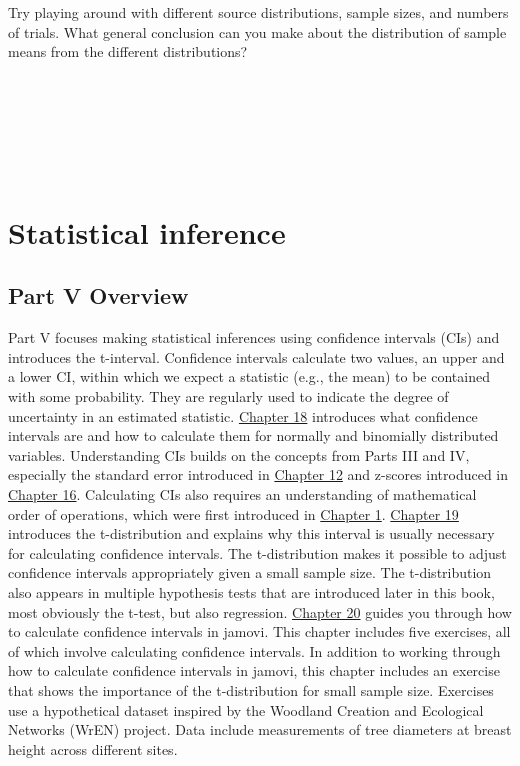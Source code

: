 \documentclass[
]{scrbook}
\begin{document}
\begin{verbatim}






\end{verbatim}

Try playing around with different source distributions, sample sizes, and numbers of trials.
What general conclusion can you make about the distribution of sample means from the different distributions?

\begin{verbatim}






\end{verbatim}

\hypertarget{part-statistical-inference}{%
\part{Statistical inference}\label{part-statistical-inference}}

\hypertarget{Week5}{%
\chapter*{Part V Overview}\label{Week5}}

Part V focuses making statistical inferences using confidence intervals (CIs) and introduces the t-interval.
Confidence intervals calculate two values, an upper and a lower CI, within which we expect a statistic (e.g., the mean) to be contained with some probability.
They are regularly used to indicate the degree of uncertainty in an estimated statistic.
\protect\hyperlink{Chapter_18}{Chapter 18} introduces what confidence intervals are and how to calculate them for normally and binomially distributed variables.
Understanding CIs builds on the concepts from Parts III and IV, especially the standard error introduced in \protect\hyperlink{Chapter_12}{Chapter 12} and z-scores introduced in \protect\hyperlink{Chapter_16}{Chapter 16}.
Calculating CIs also requires an understanding of mathematical order of operations, which were first introduced in \protect\hyperlink{Chapter_1}{Chapter 1}.
\protect\hyperlink{Chapter_19}{Chapter 19} introduces the t-distribution and explains why this interval is usually necessary for calculating confidence intervals.
The t-distribution makes it possible to adjust confidence intervals appropriately given a small sample size.
The t-distribution also appears in multiple hypothesis tests that are introduced later in this book, most obviously the t-test, but also regression.
\protect\hyperlink{Chapter_20}{Chapter 20} guides you through how to calculate confidence intervals in jamovi.
This chapter includes five exercises, all of which involve calculating confidence intervals.
In addition to working through how to calculate confidence intervals in jamovi, this chapter includes an exercise that shows the importance of the t-distribution for small sample size.
Exercises use a hypothetical dataset inspired by the Woodland Creation and Ecological Networks (WrEN) project.
Data include measurements of tree diameters at breast height across different sites.
\end{document}
